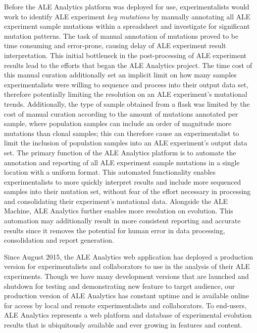 \documentclass[12pt,final,masters,chapterheads]{ucsd}  %
\begin{document}
%
%
Before the ALE Analytics platform was deployed for use, experimentalists would work to identify ALE experiment \textit{key mutations} by manually annotating all ALE experiment sample mutations within a spreadsheet and investigate for significant mutation patterns. The task of manual annotation of mutations proved to be time consuming and error-prone, causing delay of ALE experiment result interpretation. This initial bottleneck in the post-processing of ALE experiment results lead to the efforts that began the ALE Analytics project. The time cost of this manual curation additionally set an implicit limit on how many samples experimentalists were willing to sequence and process into their output data set, therefore potentially limiting the resolution on an ALE experiment's mutational trends. Additionally, the type of sample obtained from a flask was limited by the cost of manual curation according to the amount of mutations annotated per sample, where population samples can include an order of magnitude more mutations than clonal samples; this can therefore cause an experimentalist to limit the inclusion of population samples into an ALE experiment's output data set. The primary function of the ALE Analytics platform is to automate the annotation and reporting of all ALE experiment sample mutations in a single location with a uniform format. This automated functionality enables experimentalists to more quickly interpret results and include more sequenced samples into their mutation set, without fear of the effort necessary in processing and consolidating their experiment's mutational data. Alongside the ALE Machine, ALE Analytics further enables more resolution on evolution. This automation may additionally result in more consistent reporting and accurate results since it removes the potential for human error in data processing, consolidation and report generation.

Since August 2015, the ALE Analytics web application has deployed a production version for experimentalists and collaborators to use in the analysis of their ALE experiments. Though we have many development versions that are launched and shutdown for testing and demonstrating new feature to target audience, our production version of ALE Analytics has constant uptime and is available online for access by local and remote experimentalists and collaborators. To end-users, ALE Analytics represents a web platform and database of experimental evolution results that is ubiquitously available and ever growing in features and content.
\end{document}
